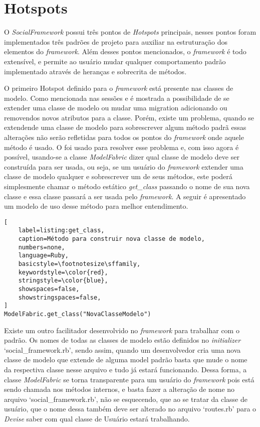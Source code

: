 \section{Hotspots}

O \textit{SocialFramework} possui três pontos de \textit{Hotspots} principais, nesses pontos foram implementados três padrões de projeto para auxiliar na estruturação dos elementos do \textit{framework}. Além desses pontos mencionados, o \textit{framework} é todo extensível, e permite ao usuário mudar qualquer comportamento padrão implementado através de heranças e sobrecrita de métodos.

O primeiro Hotspot definido para o \textit{framework} está presente nas classes de modelo. Como mencionada nas sessões  e  é mostrada a possibilidade de se extender uma classe de modelo ou mudar uma migration adicionando ou removendos novos atributos para a classe. Porém, existe um problema, quando se extendende uma classe de modelo para sobrescrever algum método padrã essas alterações não serão refletidas para todos os pontos do \textit{framework} onde aquele método é usado. O  foi usado para resolver esse problema e, com isso agora é possível, usando-se a classe \textit{ModelFabric} dizer qual classe de modelo deve ser construída para ser usada, ou seja, se um usuário do \textit{framework} extender uma classe de modelo qualquer e sobrescrever um de seus métodos, este poderá simplesmente chamar o método estático \textit{get\_class} passando o nome de sua nova classe e essa classe passará a ser usada pelo \textit{framework}. A seguir é apresentado um modelo de uso desse método para melhor entendimento.

\begin{lstlisting}[
    label=listing:get_class,
    caption=Método para construir nova classe de modelo,
    numbers=none,
    language=Ruby,
    basicstyle=\footnotesize\sffamily,
    keywordstyle=\color{red},
    stringstyle=\color{blue},
    showspaces=false,
    showstringspaces=false,
]
ModelFabric.get_class("NovaClasseModelo")
\end{lstlisting}

Existe um outro facilitador desenvolvido no \textit{framework} para trabalhar com o padrão. Os nomes de todas as classes de modelo estão definidos no \textit{initializer} `social\_framework.rb', sendo assim, quando um desenvolvedor cria uma nova classe de modelo que extende de alguma model padrão basta que mude o nome da respectiva classe nesse arquivo e tudo já estará funcionando. Dessa forma, a classe \textit{ModelFabric} se torna transparente para um usuário do \textit{framework} pois está sendo chamada nos métodos internos, e basta fazer a alteração de nome no arquivo `social\_framework.rb', não se esquecendo, que ao se tratar da classe de usuário, que o nome dessa também deve ser alterado no arquivo `routes.rb' para o \textit{Devise} saber com qual classe de Usuário estará trabalhando.

